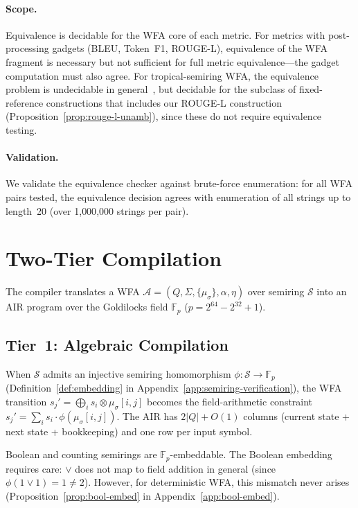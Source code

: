 \documentclass[11pt]{article}
\newcommand{\F}{\mathbb{F}}
\newcommand{\semiring}[1]{\mathcal{#1}}
\newcommand{\wfa}{\mathcal{A}}
\begin{document}
\paragraph{Scope.}
Equivalence is decidable for the WFA core of each metric.  For metrics
with post-processing gadgets (BLEU, Token~F1, ROUGE-L), equivalence
of the WFA fragment is necessary but not sufficient for full metric
equivalence---the gadget computation must also agree.
For tropical-semiring WFA, the equivalence problem is
undecidable in general~\cite{krob1994equality}, but decidable for
the subclass of fixed-reference constructions that includes our ROUGE-L
construction (Proposition~\ref{prop:rouge-l-unamb}), since these
do not require equivalence testing.

\paragraph{Validation.}
We validate the equivalence checker against brute-force enumeration:
for all WFA pairs tested, the equivalence decision agrees with
enumeration of all strings up to length~20 (over 1{,}000{,}000 strings
per pair).


\section{Two-Tier Compilation}\label{sec:compilation}

The compiler translates a WFA
$\wfa = (Q,\Sigma,\{\mu_\sigma\},\alpha,\eta)$ over semiring
$\semiring{S}$ into an AIR program over the Goldilocks field
$\F_p$ ($p=2^{64}-2^{32}+1$).

\subsection{Tier~1: Algebraic Compilation}

When $\semiring{S}$ admits an injective semiring homomorphism
$\phi:\semiring{S}\to\F_p$ (Definition~\ref{def:embedding} in
Appendix~\ref{app:semiring-verification}), the WFA transition
$s_j' = \bigoplus_i s_i \otimes \mu_\sigma[i,j]$ becomes the
field-arithmetic constraint $s_j' = \sum_i s_i \cdot \phi(\mu_\sigma[i,j])$.
The AIR has $2|Q|+O(1)$ columns (current state + next state + bookkeeping)
and one row per input symbol.

Boolean and counting semirings are $\F_p$-embeddable.  The Boolean
embedding requires care: $\lor$ does not map to field addition in general
(since $\phi(1 \lor 1) = 1 \neq 2$).  However, for deterministic WFA,
this mismatch never arises (Proposition~\ref{prop:bool-embed} in
Appendix~\ref{app:bool-embed}).
\end{document}
